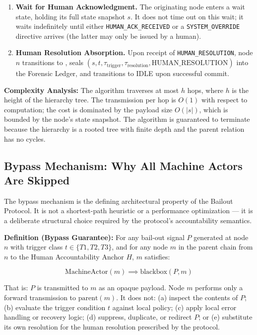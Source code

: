 \begin{enumerate}
  \item \textbf{Wait for Human Acknowledgment.} The originating node enters a wait state, holding its full state snapshot $s$. It does not time out on this wait; it waits indefinitely until either \texttt{HUMAN\_ACK\_RECEIVED} or a \texttt{SYSTEM\_OVERRIDE} directive arrives (the latter may only be issued by a human).
  \item \textbf{Human Resolution Absorption.} Upon receipt of \texttt{HUMAN\_RESOLUTION}, node $n$ transitions to , seals $(s, t, \tau_{\text{trigger}}, \tau_{\text{resolution}}, \text{HUMAN\_RESOLUTION})$ into the Forensic Ledger, and transitions to IDLE upon successful commit.
\end{enumerate}

\medskip
\noindent\textbf{Complexity Analysis:} The algorithm traverses at most $h$ hops, where $h$ is the height of the hierarchy tree. The transmission per hop is $O(1)$ with respect to computation; the cost is dominated by the payload size $O(|s|)$, which is bounded by the node's state snapshot. The algorithm is guaranteed to terminate because the hierarchy is a rooted tree with finite depth and the parent relation has no cycles.

\subsection{Bypass Mechanism: Why All Machine Actors Are Skipped}

The bypass mechanism is the defining architectural property of the Bailout Protocol. It is not a shortest-path heuristic or a performance optimization --- it is a deliberate structural choice required by the protocol's accountability semantics.

\textbf{Definition (Bypass Guarantee):} For any bail-out signal $P$ generated at node $n$ with trigger class $t \in \{T1, T2, T3\}$, and for any node $m$ in the parent chain from $n$ to the Human Accountability Anchor $H$, $m$ satisfies:

\[
\text{MachineActor}(m) \implies \text{blackbox}(P, m)
\]

That is: $P$ is transmitted to $m$ as an opaque payload. Node $m$ performs only a forward transmission to $\text{parent}(m)$. It does not: (a) inspect the contents of $P$; (b) evaluate the trigger condition $t$ against local policy; (c) apply local error handling or recovery logic; (d) suppress, duplicate, or redirect $P$; or (e) substitute its own resolution for the human resolution prescribed by the protocol.

